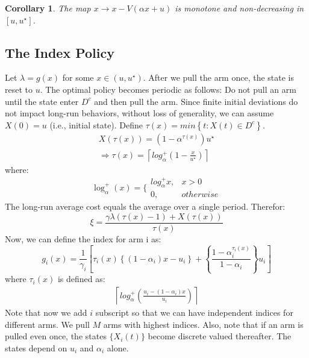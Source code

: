 \documentclass[conference]{IEEEtran}
\newtheorem{corollari}{Corollary}[theorem]
\begin{document}
\begin{corollari}
 The map $x \rightarrow x - V(\alpha x+u)$ is monotone and non-decreasing in $\left [u, u^{\star}  \right ]$.
\end{corollari}

\subsection{The Index Policy}
Let $\lambda=g(x)$ for some $x\in(u, u^{\star})$. After we pull the arm once, the state is reset to $u$. The optimal policy becomes periodic as follows: Do not pull an arm until the state enter $D^{c}$ and then pull the arm. Since finite initial deviations do not impact long-run behaviors, without loss of generality, we can assume $X(0)=u$ (i.e., initial state). Define $\tau(x)=min\left \{t: X(t) \in D^{c} \right \}$.
\begin{eqnarray*}
    X(\tau(x)) = (1-\alpha^{\tau(x)})u^{\star}\\
    \Rightarrow \tau(x)=   \left \lceil log_{\alpha}^{+} (1-\frac{x}{u^\star}) \right \rceil
\end{eqnarray*}
where:
\begin{equation*}
  \log_{\alpha}^{+}(x)=\{
    \begin{array}{ll}
      log_{\alpha}^{+}x, &  x>0\\
      0, & otherwise
    \end{array}
\end{equation*}
The long-run average cost equals the average over a single period. Therefor:
\begin{equation}
    \xi = \frac{\gamma \lambda(\tau(x)-1)+X(\tau(x))}{\tau(x)}
\end{equation}
Now, we can define the index for arm i as:
\begin{equation}
    g_i(x) = \frac{1}{\gamma_i}\left[\tau_i(x) \left\{(1-\alpha_i)x -u_i\right \}+\left \{ \frac{1-\alpha_i^{\tau_i(x)}}{1-\alpha_i} \right \}u_i \right ]
\end{equation}
where $\tau_i(x)$ is defined as:
\begin{eqnarray*}
       \left \lceil log_{\alpha}^{+} (\frac{u_i - (1-\alpha_i)x}{u_i}) \right \rceil
\end{eqnarray*}
Note that now we add $i$ subscript so that we can have independent indices for different arms. We pull $M$ arms with highest indices. Also, note that if an arm is pulled even once, the states $\{X_i(t)\}$ become discrete valued thereafter. The states depend on $u_i$ and $\alpha_i$ alone. 
\end{document}
